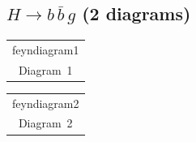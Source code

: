 \documentclass[a4paper,11pt]{article}
\makeatletter
\newcommand{\FeynDiagram}[1]{\csname feyndiagram#1\endcsname}
\newcommand{\FeynCell}[1]{\begin{tabular}[t]{@{}c@{}}\FeynDiagram{#1}\\[1ex]\small Diagram~#1\end{tabular}}
\makeatother
\begin{document}
\setlength{\parindent}{0pt}
\subsection*{$H \to b\,\bar{b}\,g$ \normalfont(2 diagrams)}
\noindent \FeynCell{1}\hfill \FeynCell{2}\par\bigskip
\end{document}
